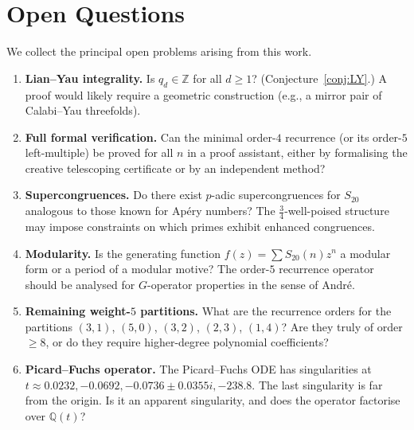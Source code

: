 \documentclass[12pt,reqno]{amsart}
\theoremstyle{plain}
\theoremstyle{definition}
\theoremstyle{remark}
\newcommand{\ZZ}{\mathbb{Z}}
\newcommand{\QQ}{\mathbb{Q}}
\begin{document}
\section{Open Questions}\label{sec:open}

We collect the principal open problems arising from this work.

\begin{enumerate}
\item \textbf{Lian--Yau integrality.}
Is $q_d \in \ZZ$ for all $d \ge 1$?
(Conjecture~\ref{conj:LY}.)
A proof would likely require a geometric construction
(e.g., a mirror pair of Calabi--Yau threefolds).

\item \textbf{Full formal verification.}
Can the minimal order-$4$ recurrence (or its order-$5$ left-multiple) be proved for all $n$ in a
proof assistant, either by formalising the creative
telescoping certificate or by an independent method?

\item \textbf{Supercongruences.}
Do there exist $p$-adic supercongruences for $S_{20}$
analogous to those known for Ap\'ery numbers?
The $\tfrac{3}{4}$-well-poised structure may impose
constraints on which primes exhibit enhanced congruences.

\item \textbf{Modularity.}
Is the generating function $f(z) = \sum S_{20}(n) z^n$
a modular form or a period of a modular motive?
The order-$5$ recurrence operator should be analysed for
$G$-operator properties in the sense of Andr\'e.

\item \textbf{Remaining weight-$5$ partitions.}
What are the recurrence orders for the partitions
$(3,1)$, $(5,0)$, $(3,2)$, $(2,3)$, $(1,4)$?
Are they truly of order $\ge 8$, or do they require
higher-degree polynomial coefficients?

\item \textbf{Picard--Fuchs operator.}
The Picard--Fuchs ODE has singularities at
$t \approx 0.0232, -0.0692, -0.0736 \pm 0.0355i, -238.8$.
The last singularity is far from the origin.
Is it an apparent singularity, and does the operator
factorise over $\QQ(t)$?
\end{enumerate}


\end{document}
